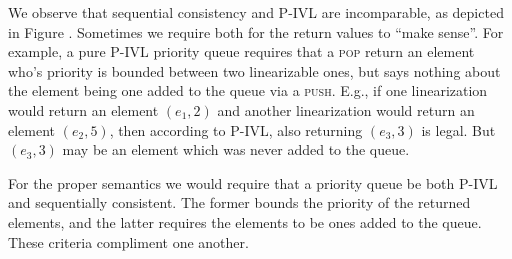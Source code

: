 We observe that sequential consistency  and P-IVL are incomparable,
as depicted in Figure . Sometimes we require both for the return
values to ``make sense''. For example, a pure P-IVL priority queue requires
that a \textsc{pop} return an element who's priority is bounded between
two linearizable ones, but says nothing about the element being one added
to the queue via a \textsc{push}. E.g., if one linearization would return
an element $(e_1,2)$ and another linearization would return an element $(e_2,5)$, then
according to P-IVL, also returning $(e_3,3)$ is legal. But $(e_3,3)$ may be an element
which was never added to the queue.

For the proper semantics we would require that a priority queue be both
P-IVL and sequentially consistent. The former bounds the priority of the returned
elements, and the latter requires the elements to be ones added to the queue.
These criteria compliment one another.